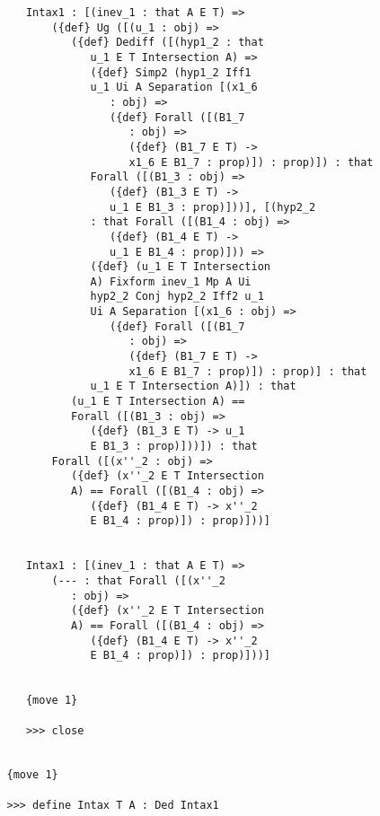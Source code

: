 \documentclass[12pt]{article}
\begin{document}
\begin{verbatim}
      Intax1 : [(inev_1 : that A E T) => 
          ({def} Ug ([(u_1 : obj) => 
             ({def} Dediff ([(hyp1_2 : that 
                u_1 E T Intersection A) => 
                ({def} Simp2 (hyp1_2 Iff1 
                u_1 Ui A Separation [(x1_6 
                   : obj) => 
                   ({def} Forall ([(B1_7 
                      : obj) => 
                      ({def} (B1_7 E T) -> 
                      x1_6 E B1_7 : prop)]) : prop)]) : that 
                Forall ([(B1_3 : obj) => 
                   ({def} (B1_3 E T) -> 
                   u_1 E B1_3 : prop)]))], [(hyp2_2 
                : that Forall ([(B1_4 : obj) => 
                   ({def} (B1_4 E T) -> 
                   u_1 E B1_4 : prop)])) => 
                ({def} (u_1 E T Intersection 
                A) Fixform inev_1 Mp A Ui 
                hyp2_2 Conj hyp2_2 Iff2 u_1 
                Ui A Separation [(x1_6 : obj) => 
                   ({def} Forall ([(B1_7 
                      : obj) => 
                      ({def} (B1_7 E T) -> 
                      x1_6 E B1_7 : prop)]) : prop)] : that 
                u_1 E T Intersection A)]) : that 
             (u_1 E T Intersection A) == 
             Forall ([(B1_3 : obj) => 
                ({def} (B1_3 E T) -> u_1 
                E B1_3 : prop)]))]) : that 
          Forall ([(x''_2 : obj) => 
             ({def} (x''_2 E T Intersection 
             A) == Forall ([(B1_4 : obj) => 
                ({def} (B1_4 E T) -> x''_2 
                E B1_4 : prop)]) : prop)]))]


      Intax1 : [(inev_1 : that A E T) => 
          (--- : that Forall ([(x''_2 
             : obj) => 
             ({def} (x''_2 E T Intersection 
             A) == Forall ([(B1_4 : obj) => 
                ({def} (B1_4 E T) -> x''_2 
                E B1_4 : prop)]) : prop)]))]


      {move 1}

      >>> close


   {move 1}

   >>> define Intax T A : Ded Intax1



\end{verbatim}
\end{document}
